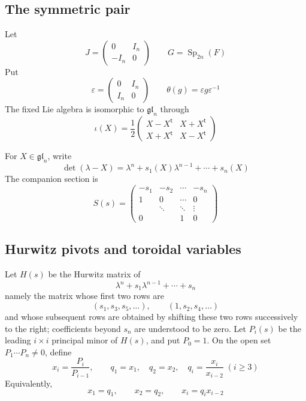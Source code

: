 \documentclass[11pt]{amsart}
\theoremstyle{definition}
\theoremstyle{remark}
\newcommand{\Sp}{\operatorname{Sp}}
\newcommand{\trans}{\mathsf t}
\newcommand{\glie}{\mathfrak{gl}}
\begin{document}
\subsection{The symmetric pair}
Let
\[
 J=\begin{pmatrix}0&I_n\\-I_n&0\end{pmatrix}
 \qquad
 G=\Sp_{2n}(F)
\]
Put
\[
 \varepsilon=\begin{pmatrix}0&I_n\\I_n&0\end{pmatrix}
 \qquad
 \theta(g)=\varepsilon g\varepsilon^{-1}
\]
The fixed Lie algebra is isomorphic to $\glie_n$ through
\begin{equation}\label{eq:typeCI-iota}
 \iota(X)=\frac12
 \begin{pmatrix}
 X-X^{\trans}&X+X^{\trans}\\
 X+X^{\trans}&X-X^{\trans}
 \end{pmatrix}
\end{equation}

For $X\in\glie_n$, write
\[
 \det(\lambda-X)=\lambda^n+s_1(X)\lambda^{n-1}+\cdots+s_n(X)
\]
The companion section is
\begin{equation}\label{eq:typeCI-companion}
 S(s)=
 \begin{pmatrix}
 -s_1&-s_2&\cdots&-s_n\\
 1&0&\cdots&0\\
 &\ddots&\ddots&\vdots\\
 0&&1&0
 \end{pmatrix}
\end{equation}

\subsection{Hurwitz pivots and toroidal variables}
Let $H(s)$ be the Hurwitz matrix of
\[
 \lambda^n+s_1\lambda^{n-1}+\cdots+s_n
\]
namely the matrix whose first two rows are
\[
 (s_1,s_3,s_5,\ldots),\qquad (1,s_2,s_4,\ldots)
\]
and whose subsequent rows are obtained by shifting these two rows successively
to the right; coefficients beyond $s_n$ are understood to be zero.  Let
$P_i(s)$ be the leading $i\times i$ principal minor of $H(s)$, and put
$P_0=1$.  On the open set $P_1\cdots P_n\neq0$, define
\[
 x_i=\frac{P_i}{P_{i-1}},
 \qquad
 q_1=x_1,
 \quad q_2=x_2,
 \quad q_i=\frac{x_i}{x_{i-2}}\;(i\geq3)
\]
Equivalently,
\[
 x_1=q_1,
 \qquad x_2=q_2,
 \qquad x_i=q_ix_{i-2}
\]
\end{document}
